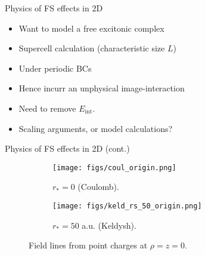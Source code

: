 \documentclass[12pt, pdf, hyperref={draft}, usenames, dvipsnames]{beamer}
\begin{document}
\begin{frame}{Physics of FS effects in 2D}
\begin{minipage}[t]{0.5\textwidth}
\vfill
\begin{center}
\vfill
\end{center}
\end{minipage}%
\hfill
\begin{minipage}[t]{0.5\textwidth}
\begin{itemize}
\item<1-> Want to model a free excitonic complex
\item<2-> Supercell calculation (characteristic size $L$)
\item<3-> Under periodic BCs
\item<4-> Hence incurr an unphysical image-interaction
\end{itemize}
\end{minipage}%
\vfill
\begin{itemize}
\item<5-> Need to remove $E_{\text{int}}$.
\item<5-> Scaling arguments, or model calculations?
\end{itemize}
\end{frame}

\begin{frame}{Physics of FS effects in 2D (cont.)}
\begin{figure}[H]
\centering
\begin{subfigure}{.5\textwidth}
  \centering
  \texttt{[image: figs/coul\_origin.png]}
  \caption{$r_*=0$ (Coulomb).}
  \label{fig:sub1}
\end{subfigure}%
\begin{subfigure}{.5\textwidth}
  \centering
  \texttt{[image: figs/keld\_rs\_50\_origin.png]}
  \caption{$r_*=50$ a.u. (Keldysh).}
  \label{fig:sub2}
\end{subfigure}
\caption{Field lines from point charges at $\rho=z=0$.}
\label{fig:field_lines}
\end{figure}
\end{frame}
\end{document}
